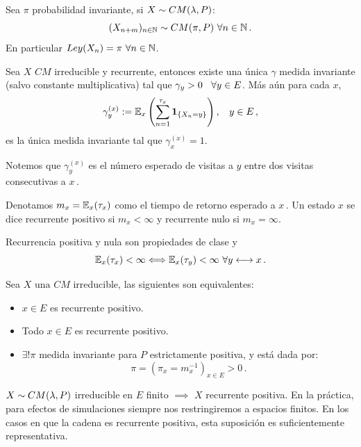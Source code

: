 \begin{proposition}
Sea $\pi$ probabilidad invariante, si $X\sim CM(\lambda,P)$:
$$ (X_{n+m})_{n\in \mathbb{N}}\sim CM(\pi,P) \mbox{ }\forall n\in \mathbb{N} \, .$$
En particular $Ley(X_n)=\pi \mbox{ }\forall n \in\mathbb{N}$.
\end{proposition}
\begin{theorem}
Sea $X$ $CM$ irreducible y recurrente, entonces existe una única $\gamma$ medida invariante  (salvo constante multiplicativa) tal que $\gamma_y>0\hspace{.25cm}\, \forall y \in E$.
\newline Más aún para cada $x$, 
$$\gamma_y^{(x)}:=\mathbb{E}_x\left(\displaystyle\sum^{\tau_x}_{n=1}\mathbf{1}_{\{X_n=y\}}\right),\hspace{.25cm}\, y\in E \, ,$$
es la única medida invariante tal que $\gamma_x^{(x)}=1$.
\end{theorem}
\begin{remark}
Notemos que $\gamma_y^{(x)}$ es el número esperado de visitas a $y$ entre dos visitas consecutivas a $x$\,.
\end{remark}
\begin{definition}
Denotamos $m_x=\mathbb{E}_x(\tau_x)$ como el tiempo de retorno esperado a $x$\,.
\newline Un estado $x$ se dice recurrente positivo si $m_x<\infty$ y recurrente nulo si $m_x=\infty$.
\end{definition}
\begin{remark}
Recurrencia positiva y nula son propiedades de clase y 
$$\mathbb{E}_x(\tau_x)<\infty\Longleftrightarrow\mathbb{E}_x(\tau_y)<\infty \mbox{ }\forall y\longleftrightarrow x \, .$$
\end{remark}
\begin{theorem}
Sea $X \mbox{ una } CM$ irreducible, las siguientes son equivalentes:
\begin{itemize}
    \item $x\in E$ es recurrente positivo.
    \item Todo $x\in E$ es recurrente positivo.
    \item $\exists ! \pi$ medida invariante para $P$ estrictamente positiva, y está dada por:
    $$ \pi = (\pi_x=m_x^{-1})_{x\in E}>0 \, .$$
\end{itemize}
\end{theorem}
\begin{remark}
$X\sim CM(\lambda,P)$ irreducible en $E$ finito $\implies$ $X$ recurrente positiva.
\newline En la práctica, para efectos de simulaciones siempre nos restringiremos a espacios finitos.  En los casos en que la cadena es recurrente positiva, esta suposición es suficientemente representativa.
\end{remark}
